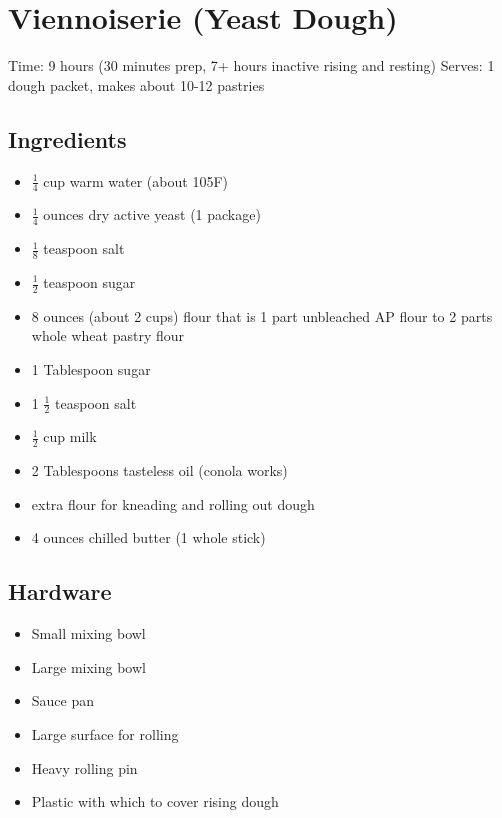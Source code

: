 \section{Viennoiserie (Yeast Dough)}
\label{viennoiserie}
\setcounter{secnumdepth}{0}
Time: 9 hours (30 minutes prep, 7+ hours inactive rising and resting)
Serves: 1 dough packet, makes about 10-12 pastries

\begin{multicols}{2}
\subsection*{Ingredients}
\begin{itemize}
    \item \( \frac{1}{4} \) cup warm water (about 105F)
    \item \( \frac{1}{4} \) ounces dry active yeast (1 package)
    \item \( \frac{1}{8} \) teaspoon salt
    \item \( \frac{1}{2} \) teaspoon sugar
    \item 8 ounces (about 2 cups) flour that is 1 part unbleached AP flour to 2 parts whole wheat pastry flour
    \item 1 Tablespoon sugar
    \item 1 \( \frac{1}{2} \) teaspoon salt
    \item \( \frac{1}{2} \) cup milk
    \item 2 Tablespoons tasteless oil (conola works)
    \item extra flour for kneading and rolling out dough
    \item 4 ounces chilled butter (1 whole stick)
\end{itemize}

\subsection*{Hardware}
\begin{itemize}
    \item Small mixing bowl
    \item Large mixing bowl
    \item Sauce pan
    \item Large surface for rolling
    \item Heavy rolling pin
    \item Plastic with which to cover rising dough
\end{itemize}
\clearpage


\end{multicols}
